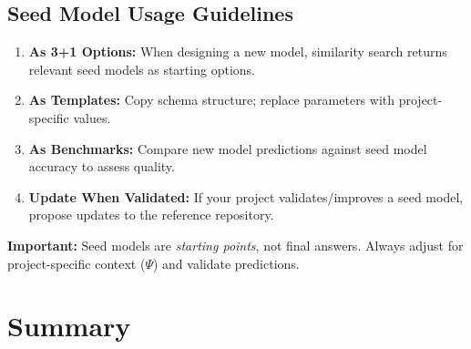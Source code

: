 \subsection{Seed Model Usage Guidelines}

\begin{tcolorbox}[colback=green!5!white, colframe=green!75!black,
    title=How to Use Seed Models]
\begin{enumerate}
\item \textbf{As 3+1 Options:} When designing a new model, similarity search
    returns relevant seed models as starting options.
\item \textbf{As Templates:} Copy schema structure; replace parameters with
    project-specific values.
\item \textbf{As Benchmarks:} Compare new model predictions against seed model
    accuracy to assess quality.
\item \textbf{Update When Validated:} If your project validates/improves a seed
    model, propose updates to the reference repository.
\end{enumerate}

\textbf{Important:} Seed models are \textit{starting points}, not final answers.
Always adjust for project-specific context ($\Psi$) and validate predictions.
\end{tcolorbox}



\section{Summary}
\label{sec:fff-summary}

